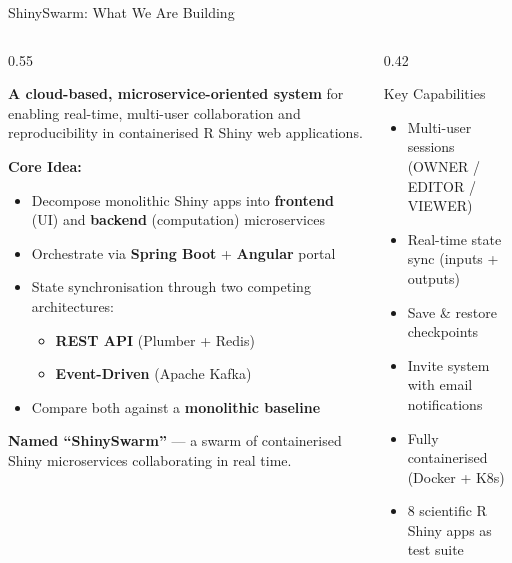 \documentclass[aspectratio=169]{beamer}
\begin{document}
\begin{frame}{ShinySwarm: What We Are Building}

\begin{columns}[T]
\begin{column}{0.55\textwidth}

\textbf{A cloud-based, microservice-oriented system} for enabling real-time, multi-user collaboration and reproducibility in containerised R Shiny web applications.

\vspace{1em}
\textbf{Core Idea:}
\begin{itemize}
    \item Decompose monolithic Shiny apps into \textbf{frontend} (UI) and \textbf{backend} (computation) microservices
    \item Orchestrate via \textbf{Spring Boot} + \textbf{Angular} portal
    \item State synchronisation through two competing architectures:
    \begin{itemize}
        \item \textbf{REST API} (Plumber + Redis)
        \item \textbf{Event-Driven} (Apache Kafka)
    \end{itemize}
    \item Compare both against a \textbf{monolithic baseline}
\end{itemize}

\vspace{0.5em}
\textbf{Named ``ShinySwarm''} --- a swarm of containerised Shiny microservices collaborating in real time.

\end{column}
\begin{column}{0.42\textwidth}

\begin{exampleblock}{Key Capabilities}
\begin{itemize}
    \item[\faUsers] Multi-user sessions (OWNER / EDITOR / VIEWER)
    \item[\faSync] Real-time state sync (inputs + outputs)
    \item[\faSave] Save \& restore checkpoints
    \item[\faEnvelope] Invite system with email notifications
    \item[\faDocker] Fully containerised (Docker + K8s)
    \item[\faFlask] 8 scientific R Shiny apps as test suite
\end{itemize}
\end{exampleblock}


\end{column}
\end{columns}
\end{frame}
\end{document}
